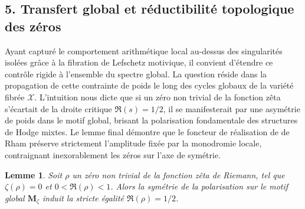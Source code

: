 \documentclass[
]{article}
\newtheorem{lemma}{Lemme}
\begin{document}
\hypertarget{transfert-global-et-reductibilite-topologique-des-zeros}{%
\subsection{5. Transfert global et réductibilité topologique des zéros}\label{transfert-global-et-reductibilite-topologique-des-zeros}}

Ayant capturé le comportement arithmétique local au-dessus des singularités isolées grâce à la fibration de Lefschetz motivique, il convient d'étendre ce contrôle rigide à l'ensemble du spectre global. La question réside dans la propagation de cette contrainte de poids le long des cycles globaux de la variété fibrée $\mathcal{X}$. L'intuition nous dicte que si un zéro non trivial de la fonction zêta s'écartait de la droite critique $\Re(s) = 1/2$, il se manifesterait par une asymétrie de poids dans le motif global, brisant la polarisation fondamentale des structures de Hodge mixtes. Le lemme final démontre que le foncteur de réalisation de de Rham préserve strictement l'amplitude fixée par la monodromie locale, contraignant inexorablement les zéros sur l'axe de symétrie.

\begin{lemma}
Soit $\rho$ un zéro non trivial de la fonction zêta de Riemann, tel que $\zeta(\rho) = 0$ et $0 < \Re(\rho) < 1$. Alors la symétrie de la polarisation sur le motif global $\mathbf{M}_{\zeta}$ induit la stricte égalité $\Re(\rho) = 1/2$.
\end{lemma}
\end{document}

